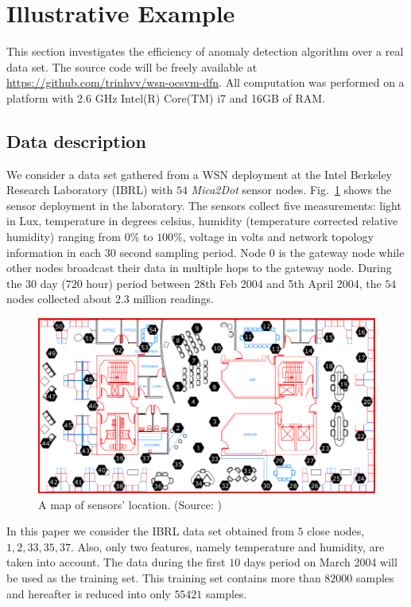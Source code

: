 \documentclass[conference]{IEEEtran}
\begin{document}
\section{Illustrative Example}\label{sec:Illustrative}

This section investigates the efficiency of anomaly detection algorithm over a real data set. The source code will be freely available at \url{https://github.com/trinhvv/wsn-ocsvm-dfn}. All computation was performed on a platform with 2.6 GHz Intel(R) Core(TM) i7 and 16GB of RAM.

\subsection{Data description}

We consider a data set gathered from a WSN deployment at the Intel Berkeley Research Laboratory (IBRL) \cite{Buonadonna2005} with $54$ \emph{Mica2Dot} sensor nodes. Fig.~\ref{fig:sensor_map} shows the sensor deployment in the laboratory. The sensors collect five measurements: light in Lux, temperature in degrees celsius, humidity (temperature corrected relative humidity) ranging from $0\%$ to $100\%$, voltage in volts and network topology information in each $30$ second sampling period. Node $0$ is the gateway node while other nodes broadcast their data in multiple hops to the gateway node. During the $30$ day ($720$ hour) period between 28th Feb 2004 and 5th April 2004, the $54$ nodes collected about $2.3$ million readings.

\begin{figure}[H]
\centering
\includegraphics[scale=.25]{Figs/ibrl_wsn.png}
\caption{A map of sensors' location. (Source: \cite{Buonadonna2005})}
\label{fig:sensor_map}
\end{figure}

In this paper we consider the IBRL data set obtained from $5$ close nodes, $1, 2, 33, 35, 37$. Also, only two features, namely temperature and humidity, are taken into account. The data during the first $10$ days period on March 2004 will be used as the training set. This training set contains more than $82000$ samples and hereafter is reduced into only $55421$ samples. 
\end{document}
